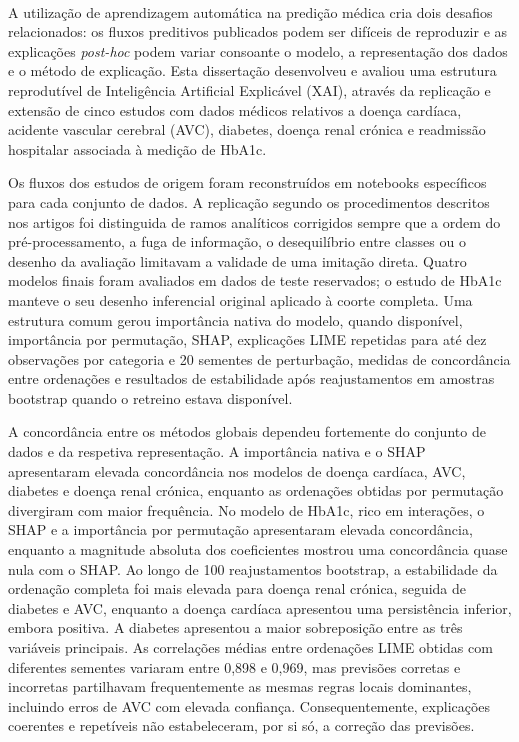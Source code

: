 \paragraph{}
A utilização de aprendizagem automática na predição médica cria dois desafios relacionados: os fluxos preditivos publicados podem ser difíceis de reproduzir e as explicações \textit{post-hoc} podem variar consoante o modelo, a representação dos dados e o método de explicação. Esta dissertação desenvolveu e avaliou uma estrutura reprodutível de Inteligência Artificial Explicável (XAI), através da replicação e extensão de cinco estudos com dados médicos relativos a doença cardíaca, acidente vascular cerebral (AVC), diabetes, doença renal crónica e readmissão hospitalar associada à medição de HbA1c.

Os fluxos dos estudos de origem foram reconstruídos em notebooks específicos para cada conjunto de dados. A replicação segundo os procedimentos descritos nos artigos foi distinguida de ramos analíticos corrigidos sempre que a ordem do pré-processamento, a fuga de informação, o desequilíbrio entre classes ou o desenho da avaliação limitavam a validade de uma imitação direta. Quatro modelos finais foram avaliados em dados de teste reservados; o estudo de HbA1c manteve o seu desenho inferencial original aplicado à coorte completa. Uma estrutura comum gerou importância nativa do modelo, quando disponível, importância por permutação, SHAP, explicações LIME repetidas para até dez observações por categoria e 20 sementes de perturbação, medidas de concordância entre ordenações e resultados de estabilidade após reajustamentos em amostras bootstrap quando o retreino estava disponível.

A concordância entre os métodos globais dependeu fortemente do conjunto de dados e da respetiva representação. A importância nativa e o SHAP apresentaram elevada concordância nos modelos de doença cardíaca, AVC, diabetes e doença renal crónica, enquanto as ordenações obtidas por permutação divergiram com maior frequência. No modelo de HbA1c, rico em interações, o SHAP e a importância por permutação apresentaram elevada concordância, enquanto a magnitude absoluta dos coeficientes mostrou uma concordância quase nula com o SHAP. Ao longo de 100 reajustamentos bootstrap, a estabilidade da ordenação completa foi mais elevada para doença renal crónica, seguida de diabetes e AVC, enquanto a doença cardíaca apresentou uma persistência inferior, embora positiva. A diabetes apresentou a maior sobreposição entre as três variáveis principais. As correlações médias entre ordenações LIME obtidas com diferentes sementes variaram entre 0,898 e 0,969, mas previsões corretas e incorretas partilhavam frequentemente as mesmas regras locais dominantes, incluindo erros de AVC com elevada confiança. Consequentemente, explicações coerentes e repetíveis não estabeleceram, por si só, a correção das previsões.

